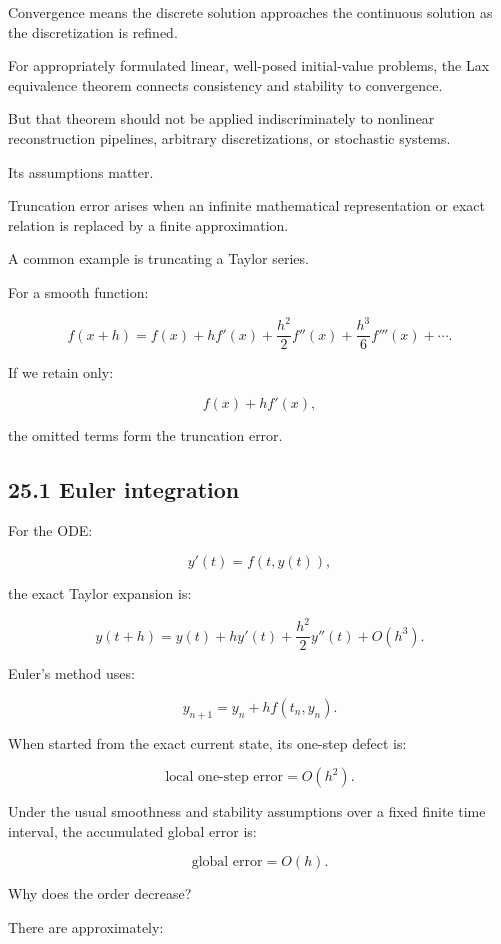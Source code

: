 Convergence means the discrete solution approaches the continuous solution as the discretization is refined.

For appropriately formulated linear, well-posed initial-value problems, the Lax equivalence theorem connects consistency and stability to convergence.

But that theorem should not be applied indiscriminately to nonlinear reconstruction pipelines, arbitrary discretizations, or stochastic systems.

Its assumptions matter.

Truncation error arises when an infinite mathematical representation or exact relation is replaced by a finite approximation.

A common example is truncating a Taylor series.

For a smooth function:

\[ f(x+h) = f(x)+hf'(x)+\frac{h^2}{2}f''(x) +\frac{h^3}{6}f'''(x)+\cdots. \]

If we retain only:

\[ f(x)+hf'(x), \]

the omitted terms form the truncation error.

\subsection{25.1 Euler integration}\label{02-foundations-ii-ch029-euler-integration}

\hypertarget{02-foundations-ii-ch029-euler-integration}{}

For the ODE:

\[ y'(t)=f(t,y(t)), \]

the exact Taylor expansion is:

\[ y(t+h) = y(t)+hy'(t)+\frac{h^2}{2}y''(t)+O(h^3). \]

Euler's method uses:

\[ y_{n+1}=y_n+hf(t_n,y_n). \]

When started from the exact current state, its one-step defect is:

\[ \boxed{ \text{local one-step error}=O(h^2) }. \]

Under the usual smoothness and stability assumptions over a fixed finite time interval, the accumulated global error is:

\[ \boxed{ \text{global error}=O(h) }. \]

Why does the order decrease?

There are approximately:

